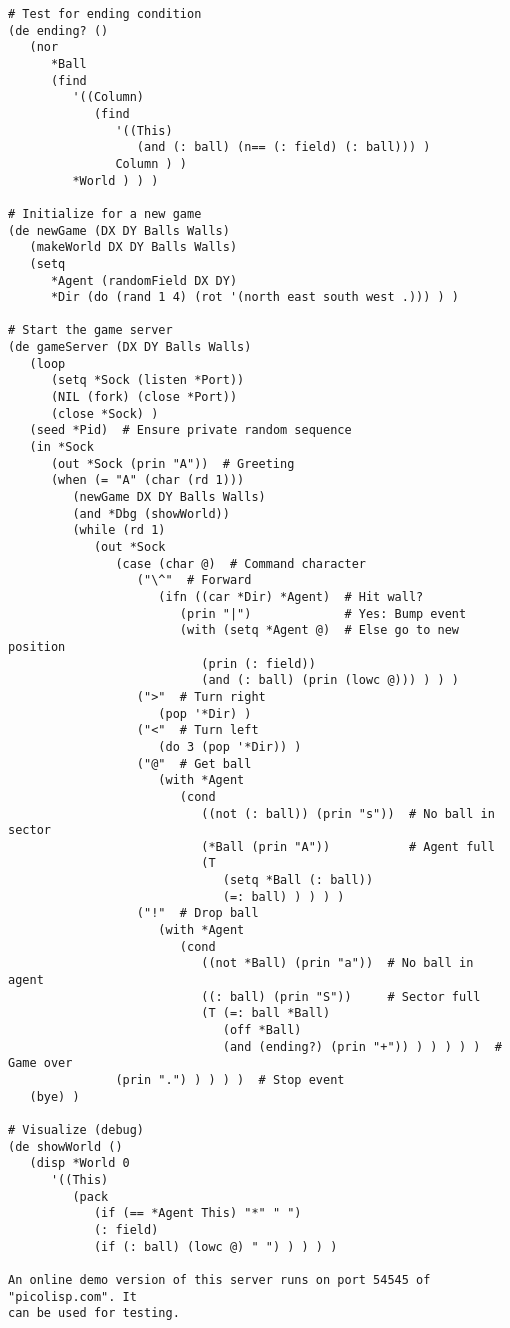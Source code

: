 \begin{verbatim}
# Test for ending condition
(de ending? ()
   (nor
      *Ball
      (find
         '((Column)
            (find
               '((This)
                  (and (: ball) (n== (: field) (: ball))) )
               Column ) )
         *World ) ) )

# Initialize for a new game
(de newGame (DX DY Balls Walls)
   (makeWorld DX DY Balls Walls)
   (setq
      *Agent (randomField DX DY)
      *Dir (do (rand 1 4) (rot '(north east south west .))) ) )

# Start the game server
(de gameServer (DX DY Balls Walls)
   (loop
      (setq *Sock (listen *Port))
      (NIL (fork) (close *Port))
      (close *Sock) )
   (seed *Pid)  # Ensure private random sequence
   (in *Sock
      (out *Sock (prin "A"))  # Greeting
      (when (= "A" (char (rd 1)))
         (newGame DX DY Balls Walls)
         (and *Dbg (showWorld))
         (while (rd 1)
            (out *Sock
               (case (char @)  # Command character
                  ("\^"  # Forward
                     (ifn ((car *Dir) *Agent)  # Hit wall?
                        (prin "|")             # Yes: Bump event
                        (with (setq *Agent @)  # Else go to new position
                           (prin (: field))
                           (and (: ball) (prin (lowc @))) ) ) )
                  (">"  # Turn right
                     (pop '*Dir) )
                  ("<"  # Turn left
                     (do 3 (pop '*Dir)) )
                  ("@"  # Get ball
                     (with *Agent
                        (cond
                           ((not (: ball)) (prin "s"))  # No ball in sector
                           (*Ball (prin "A"))           # Agent full
                           (T
                              (setq *Ball (: ball))
                              (=: ball) ) ) ) )
                  ("!"  # Drop ball
                     (with *Agent
                        (cond
                           ((not *Ball) (prin "a"))  # No ball in agent
                           ((: ball) (prin "S"))     # Sector full
                           (T (=: ball *Ball)
                              (off *Ball)
                              (and (ending?) (prin "+")) ) ) ) ) )  # Game over
               (prin ".") ) ) ) )  # Stop event
   (bye) )

# Visualize (debug)
(de showWorld ()
   (disp *World 0
      '((This)
         (pack
            (if (== *Agent This) "*" " ")
            (: field)
            (if (: ball) (lowc @) " ") ) ) ) )

An online demo version of this server runs on port 54545 of "picolisp.com". It
can be used for testing.


\end{verbatim}
